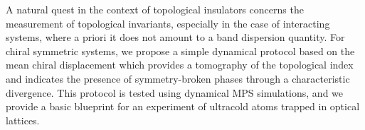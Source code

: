 A natural quest in the context of topological insulators concerns the measurement of topological invariants, especially in the case of interacting systems, where a priori it does not amount to a band dispersion quantity.
For chiral symmetric systems, we propose a simple dynamical protocol based on the mean chiral displacement which provides a tomography of the topological index and indicates the presence of symmetry-broken phases through a characteristic divergence.
This protocol is tested using dynamical MPS simulations, and we provide a basic blueprint for an experiment of ultracold atoms trapped in optical lattices.
